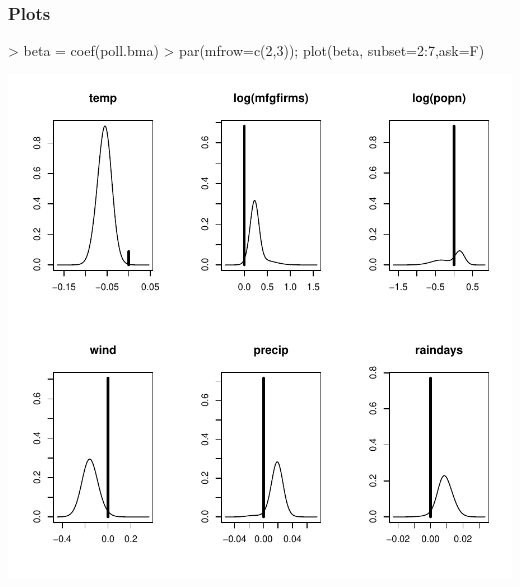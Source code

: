 \documentclass[]{beamer}
\begin{document}
\begin{frame}[fragile]\frametitle{Plots}

\centering
\begin{Schunk}
\begin{Sinput}
>  beta = coef(poll.bma)
>  par(mfrow=c(2,3));  plot(beta, subset=2:7,ask=F)
\end{Sinput}
\end{Schunk}
\includegraphics{16-bma-coef_plot}
\end{frame}
\end{document}

